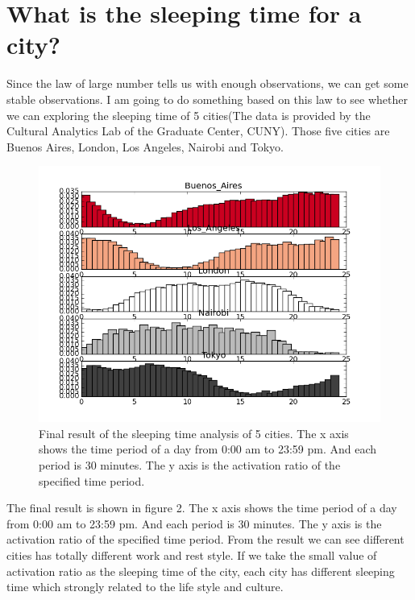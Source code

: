 \documentclass[a4paper,12pt]{article}
\begin{document}
\section{What is the sleeping time for a city?}
Since the law of large number tells us with enough observations, we can get some stable observations. I am going to do something based on this law to see whether we can exploring the sleeping time of 5 cities(The data is provided by the Cultural Analytics Lab of the Graduate Center, CUNY). Those five cities are Buenos Aires, London, Los Angeles, Nairobi and Tokyo.\\
  \begin{figure}[H]
  \begin{center}
      \includegraphics[scale=0.8]{final.png}
\end{center}
\caption{Final result of the sleeping time analysis of 5 cities. The x axis shows the time period of a day from 0:00 am to 23:59 pm. And each period is 30 minutes. The y axis is the activation ratio of the specified time period.}
 \label {fig:2}
 \end{figure}
The final result is shown in figure 2.  The x axis shows the time period of a day from 0:00 am to 23:59 pm. And each period is 30 minutes. The y axis is the activation ratio of the specified time period. From the result we can see different cities has totally different work and rest style. If we take the small value of activation ratio as the sleeping time of the city, each city has different sleeping time which strongly related to the life style and culture.\\
\end{document}
